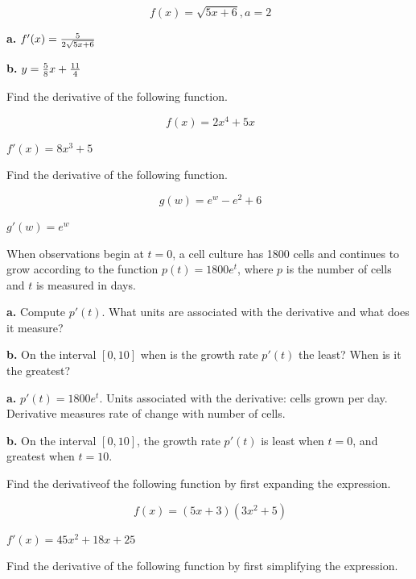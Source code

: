 $$\
f(x) = \sqrt{5x + 6}, a = 2
$$

\par {\bf a.} $f'(x) = {5 \over 2\sqrt{5x + 6}}$

\par {\bf b.} $y = {5 \over 8}x + {11 \over 4}$




Find the derivative of the following function.

$$\
f(x) = 2x^4 + 5x
$$

$f'(x) = 8x^3 + 5$
\bigskip

Find the derivative of the following function.

$$\
g(w) = e^w - e^2 + 6
$$

$g'(w) = e^w$

When observations begin at $t = 0$, a cell culture
has 1800 cells and continues to grow according to the function
$p(t) = 1800e^t$, where $p$ is the number of cells and $t$
is measured in days.

\par {\bf a.} Compute $p'(t)$. What units are associated with
the derivative and what does it measure?

\par {\bf b.} On the interval $[0, 10]$ when is the growth
rate $p'(t)$ the least? When is it the greatest?

\solution{3.3.44}

\par {\bf a.} $p'(t) = 1800e^t$.
Units associated with the derivative: cells grown per day.
Derivative measures rate of change with number of cells.

\par {\bf b.} On the interval $[0, 10]$, the growth
rate $p'(t)$ is least when $t = 0$, and greatest when
$t = 10$.

\bigskip

Find the derivativeof the following function by first expanding
the expression.

$$\
f(x) = (5x + 3)(3x^2 + 5)
$$

$f'(x) = 45x^2 + 18x + 25$
\bigskip

Find the derivative of the following function by first
simplifying the expression.

